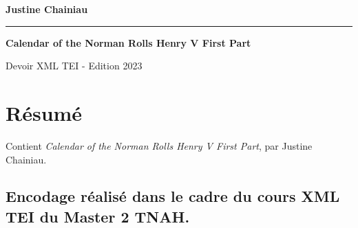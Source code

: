 \documentclass[a4paper,12pt,twoside]{book}
\begin{document}
            
            
                
	        \begin{titlepage}
		    \begin{center}
			
			
			\bigskip
			\bigskip
			\bigskip
			\begin{Large}
            
            
		    \textbf{Justine Chainiau}\\
			\end{Large}
			
			\bigskip
			\bigskip
			\bigskip
			\begin{center}\rule{2cm}{0.02cm}\end{center}
			\bigskip
			\bigskip
			\bigskip
			
			\begin{Huge}
            
            
			\textbf{Calendar of the Norman Rolls 
               Henry V  First Part}\\
			\end{Huge}
			\bigskip
			\bigskip
			
			
			\bigskip
			\bigskip
			\bigskip
			\begin{large}
			\end{large}
			\vfill
			
			\begin{large}
               Devoir XML TEI - Edition 
            2023\end{large}
			
		    \end{center}
	        \end{titlepage}
	        \newpage
        
            
            
            
            
            \tableofcontents   
            
            
	        
	        \chapter{Résumé}
	        \medskip
        
             Contient \textit{Calendar of the Norman Rolls 
               Henry V  First Part}, par Justine Chainiau.
        
            \bigskip
        
            \begin{Large} 
            
            
            \section{Encodage réalisé dans le cadre du cours XML TEI du Master 2 TNAH. }
            \end{Large}
        
\end{document}
